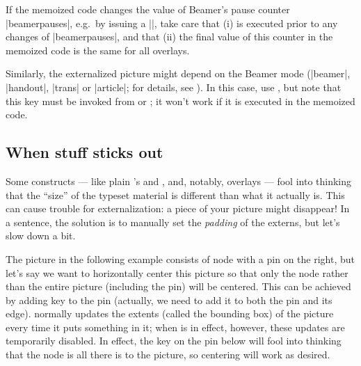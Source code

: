 \documentclass[a4paper,11pt]{article}
\begin{document}

\begin{tcolorbox}[warning]
  If the memoized code changes the value of Beamer's pause counter
  |beamerpauses|, e.g.\ by issuing a |\pause|, take care that (i)  is executed prior to any changes of |beamerpauses|, and that (ii)
  the final value of this counter in the memoized code is the same for all
  overlays.
\end{tcolorbox}

Similarly, the externalized picture might depend on the Beamer mode (|beamer|,
|handout|, |trans| or |article|; for details, see \ManualBeamer[part IV of]).
In this case, use , but note that this key must
be invoked from  or ; it won't work if it is
executed in the memoized code.


\subsection{When stuff sticks out}
\label{sec:tut:padding}

Some constructs --- like plain 's  and ,
and, notably, \TikZ overlays --- fool  into thinking that the
``size'' of the typeset material is different than what it actually is.  This
can cause trouble for externalization: a piece of your picture might disappear!
In a sentence, the solution is to manually set the \emph{padding} of the
externs, but let's slow down a bit.

The \TikZ picture in the following example consists of node with a pin on the
right, but let's say we want to horizontally center this picture so that only
the node rather than the entire picture (including the pin) will be centered.
This can be achieved by adding key  to the pin (actually,
we need to add it to both the pin and its edge).  \TikZ normally updates the
extents (called the bounding box) of the picture every time it puts something
in it; when  is in effect, however, these updates are
temporarily disabled.  In effect, the  key on the pin
below will fool  into thinking that the node is all there is to the
picture, so centering will work as desired.
\end{document}
